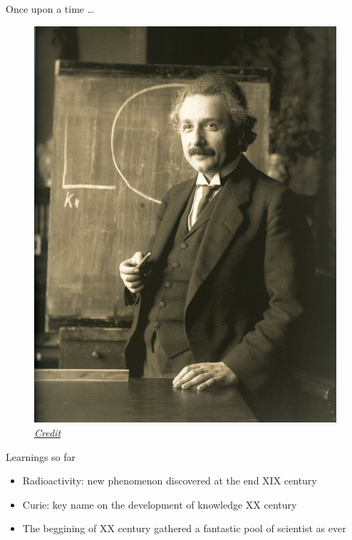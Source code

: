 \begin{frame}{Once upon a time \ldots}

\begin{figure}
\includegraphics[scale=0.25]{figures/Einstein_1921}
\caption*{\href{By Ferdinand Schmutzer - http://www.bhm.ch/de/news_04a.cfm?bid=4&jahr=2006 [dead link], archived copy (image), Public Domain, https://commons.wikimedia.org/w/index.php?curid=34239518}{\emph{Credit}}}
\end{figure}

\end{frame}

\begin{frame}{Learnings so far}

\begin{alertblock}{}

\begin{itemize}

\pause \item Radioactivity: new phenomenon discovered at the end XIX century

\pause \item Curie: key name on the development of knowledge XX century

\pause \item The beggining of XX century gathered a fantastic pool of scientist as ever

\end{itemize}

\end{alertblock}

\end{frame}

